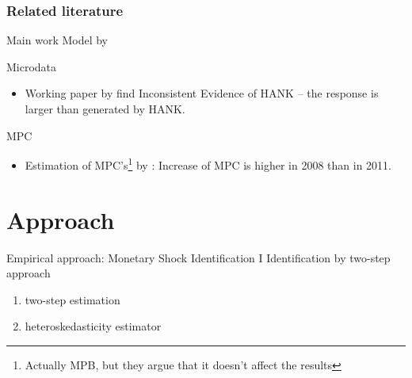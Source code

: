 \documentclass[11pt,pdf,aspectratio=129]{beamer}
\begin{document}
\begin{frame}\frametitle{Related literature}
\begin{block}{Main work}
    Model by 
\end{block}

\begin{block}{Microdata}
    \begin{itemize}
        \item     Working paper by   find Inconsistent Evidence of HANK -- the response is larger than generated by HANK.
    \end{itemize}
\end{block}
\begin{block}{MPC}
    \begin{itemize}
        \item  Estimation of MPC's\footnote{Actually MPB, but they argue that it doesn't affect the results} by :
        Increase of MPC is higher in 2008 than in 2011.
    \end{itemize}
\end{block}
\end{frame}


\section{Approach}

\begin{frame}{Empirical approach: Monetary Shock Identification I}
    Identification by  two-step approach
\begin{enumerate}
    \item {} two-step estimation
    \item   {} heteroskedasticity estimator
\end{enumerate}
\end{frame}
\end{document}
